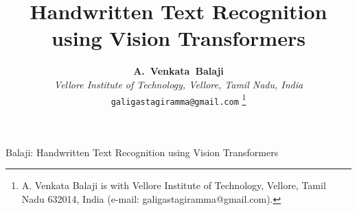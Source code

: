\documentclass{IEEEtran}
\begin{document}
\title{Handwritten Text Recognition using Vision Transformers}

\author{\textbf{\Large A.~Venkata~Balaji}\\[0.3em]
\normalsize\textit{Vellore Institute of Technology, Vellore, Tamil Nadu, India}\\[0.15em]
\normalsize\texttt{galigastagiramma@gmail.com}%
\thanks{A. Venkata Balaji is with Vellore Institute of Technology, Vellore, Tamil Nadu 632014, India (e-mail: galigastagiramma@gmail.com).}%
}

%
{Balaji: Handwritten Text Recognition using Vision Transformers}

\maketitle
\end{document}
